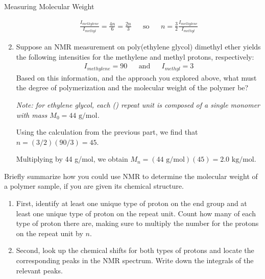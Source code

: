 \begin{activity}{Measuring Molecular Weight}
\begin{ctqs}
\begin{enumerate}
				\begin{solution}[1.25in]{}
					\begin{align*}
						\frac{I_{methylene}}{I_{methyl}} = \frac{4n}{6}=\frac{2n}{3} && \text{so} && n = \frac{3}{2}\frac{I_{methylene}}{I_{methyl}}
					\end{align*}
				\end{solution}
				
			\item Suppose an NMR measurement on poly(ethylene glycol) dimethyl ether yields the following intensities for the methylene and methyl protons, respectively:
				\begin{align*}
					I_{methylene}=90 && \text{and} &&
					I_{methyl}=3
				\end{align*}
				Based on this information, and the approach you explored above, what must the degree of polymerization and the molecular weight of the polymer be?
				
				\emph{Note: for ethylene glycol, each () repeat unit is composed of a single monomer with mass $M_0=44\text{ g/mol}$.}
				
				\begin{solution}[1.5in]{}
					Using the calculation from the previous part, we find that $n = (3/2)(90/3) = 45$.
					
					Multiplying by 44 g/mol, we obtain $M_n = (44\text{ g/mol})(45) = 2.0\text{ kg/mol}$.
				\end{solution}
				
		\end{enumerate}
		
		\question Briefly summarize how you could use NMR to determine the molecular weight of a polymer sample, if you are given its chemical structure.
		
			\begin{solution}[2in]{}
			
				\begin{enumerate}				
					\item First, identify at least one unique type of proton on the end group and at least one unique type of proton on the repeat unit.  Count how many of each type of proton there are, making sure to multiply the number for the protons on the repeat unit by $n$.
				
					\item Second, look up the chemical shifts for both types of protons and locate the corresponding peaks in the NMR spectrum.  Write down the integrals of the relevant peaks.
				

\end{enumerate}
\end{solution}
\end{ctqs}
\end{activity}

